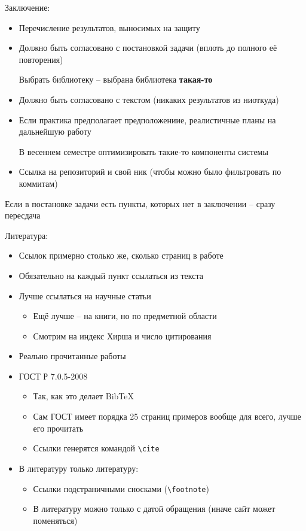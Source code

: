Заключение:
\begin{itemize}
	\item Перечисление результатов, выносимых на защиту
	\item Должно быть согласовано с постановкой задачи (вплоть до полного её повторения)
	\begin{eg}
		Выбрать библиотеку -- выбрана библиотека \textbf{такая-то}
	\end{eg}
	\item Должно быть согласовано с текстом (никаких результатов из ниоткуда)
	\item Если практика предполагает предположениие, реалистичные планы на дальнейшую работу
	\begin{eg}
		В весеннем семестре оптимизировать такие-то компоненты системы
	\end{eg}
	\item Ссылка на репозиторий и свой ник (чтобы можно было фильтровать по коммитам)
\end{itemize}

Если в постановке задачи есть пункты, которых нет в заключении -- сразу пересдача

Литература:
\begin{itemize}
	\item Ссылок примерно столько же, сколько страниц в работе
	\item Обязательно на каждый пункт ссылаться из текста
	\item Лучше ссылаться на научные статьи
	\begin{itemize}
		\item Ещё лучше -- на книги, но по предметной области
		\item Смотрим на индекс Хирша и число цитирования
	\end{itemize}
	\item Реально прочитанные работы
	\item ГОСТ Р 7.0.5-2008
	\begin{itemize}
		\item Так, как это делает BibTeX
		\item Сам ГОСТ имеет порядка 25 страниц примеров вообще для всего, лучше его прочитать
		\item Ссылки генерятся командой \verb|\cite|
	\end{itemize}
	\item В литературу только литературу:
	\begin{itemize}
		\item Ссылки подстраничными сносками (\verb|\footnote|)
		\item В литературу можно только с датой обращения (иначе сайт может поменяться)
	\end{itemize}
\end{itemize}


